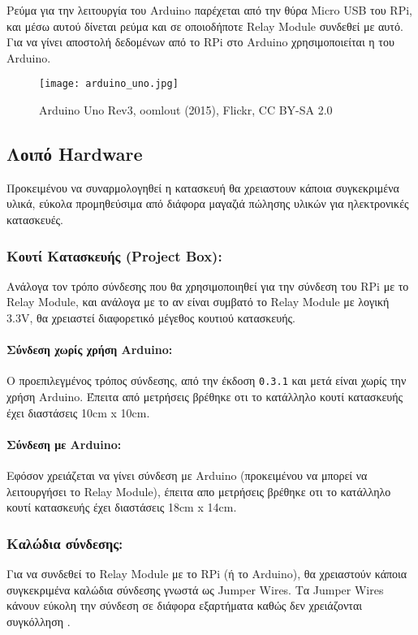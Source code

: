 		Ρεύμα για την λειτουργία του Arduino παρέχεται από την θύρα Micro USB του RPi, και μέσω αυτού δίνεται ρεύμα και σε οποιοδήποτε Relay Module συνδεθεί με αυτό. Για να γίνει αποστολή δεδομένων από το RPi στο Arduino χρησιμοποιείται η  του Arduino.

		\begin{figure}[h]
			\centering
				\texttt{[image: arduino\_uno.jpg]}
			\caption{Arduino Uno Rev3, oomlout (2015), Flickr, CC BY-SA 2.0}
		\end{figure}

	\subsection{Λοιπό Hardware}
		Προκειμένου να συναρμολογηθεί η κατασκευή θα χρειαστουν κάποια συγκεκριμένα υλικά, εύκολα προμηθεύσιμα από διάφορα μαγαζιά πώλησης υλικών για ηλεκτρονικές κατασκευές.

		\subsubsection{Κουτί Κατασκευής (Project Box):}
			Ανάλογα τον τρόπο σύνδεσης που θα χρησιμοποιηθεί για την σύνδεση του RPi με το Relay Module, και ανάλογα με το αν είναι συμβατό το Relay Module με λογική 3.3V, θα χρειαστεί διαφορετικό μέγεθος κουτιού κατασκευής. 

			\paragraph{Σύνδεση χωρίς χρήση Arduino:}
				Ο προεπιλεγμένος τρόπος σύνδεσης, από την έκδοση \verb|0.3.1| και μετά είναι χωρίς την χρήση Arduino. Έπειτα από μετρήσεις βρέθηκε οτι το κατάλληλο κουτί κατασκευής έχει διαστάσεις 10cm x 10cm.
			\paragraph{Σύνδεση με Arduino:}
				Εφόσον χρειάζεται να γίνει σύνδεση με Arduino (προκειμένου να μπορεί να λειτουργήσει το Relay Module), έπειτα απο μετρήσεις βρέθηκε οτι το κατάλληλο κουτί κατασκευής έχει διαστάσεις 18cm x 14cm.

		\subsubsection{Καλώδια σύνδεσης:}
			Για να συνδεθεί το Relay Module με το RPi (ή το Arduino), θα χρειαστούν κάποια συγκεκριμένα καλώδια σύνδεσης γνωστά ως Jumper Wires. Τα Jumper Wires κάνουν εύκολη την σύνδεση σε διάφορα εξαρτήματα καθώς δεν χρειάζονται συγκόλληση \textsuperscript{\cite{jumper_wires}}.

